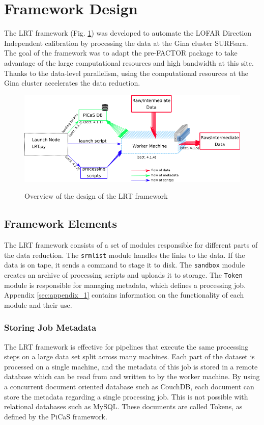 \section{Framework Design}\label{sec:design}

The LRT framework (Fig. \ref{fig:design}) was developed to automate the LOFAR Direction Independent calibration by processing the data at the Gina cluster SURFsara\cite{gina_specs}. The goal of the framework was to adapt the pre-FACTOR package to take advantage of the large computational resources and high bandwidth at this site. Thanks to the data-level parallelism, using the computational resources at the Gina cluster accelerates the data reduction. 

\begin{figure}
 \includegraphics[width=\textwidth]{ch3/figures/design.png}\\
 \caption{Overview of the design of the LRT framework}
 \label{fig:design}
\end{figure}

\subsection{Framework Elements}
The LRT framework consists of a set of modules responsible for different parts of the data reduction. The \verb|srmlist| module handles the links to the data. If the data is on tape, it sends a command to stage it to disk. The \verb|sandbox| module creates an archive of processing scripts and uploads it to storage. The \verb|Token| module is responsible for managing metadata, which defines a processing job. Appendix \ref{sec:appendix_1} contains information on the functionality of each module and their use. 

\subsubsection{Storing Job Metadata}

The LRT framework is effective for pipelines that execute the same processing steps on a large data set split across many machines. Each part of the dataset is processed on a single machine, and the metadata of this job is stored in a remote database which can be read from and written to by the worker machine. By using a concurrent document oriented database such as CouchDB\cite{couchdb}, each document can store the metadata regarding a single processing job. This is not possible with relational databases such as MySQL.  These documents are called Tokens, as defined by the PiCaS framework\cite{picas}.

